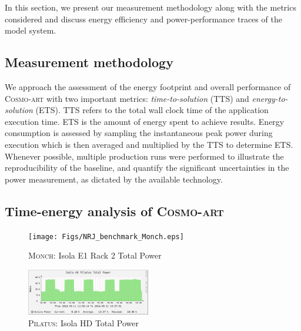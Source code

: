 In this section, we present our measurement methodology along with the
metrics considered and discuss energy efficiency and power-performance
traces of the model system.

\subsection{Measurement methodology}
\label{subsec:4.1}

We  approach  the  assessment  of  the energy  footprint  and  overall
performance   of  \textsc{Cosmo-art}   with  two   important  metrics:
\textit{time-to-solution} (TTS) and \textit{energy-to-solution} (ETS).
TTS refers to  the total wall clock time  of the application execution
time. ETS  is the amount of  energy spent to  achieve results.  Energy
consumption  is  assessed by  sampling  the  instantaneous peak  power
during execution which  is then averaged and multiplied  by the TTS to
determine  ETS.   Whenever  possible,  multiple production  runs  were
performed  to  illustrate the  reproducibility  of  the baseline,  and
quantify the  significant uncertainties  in the power  measurement, as
dictated by the available technology.

\subsection{Time-energy analysis of \textsc{Cosmo-art}}
\label{subsec:4.2}

\begin{figure}[htbf]
  \begin{center}
    \texttt{[image: Figs/NRJ\_benchmark\_Monch.eps]}
    \caption{\textsc{Monch}: Isola E1 Rack 2 Total Power}
    \label{fig:1}
  \end{center}
\end{figure}

\begin{figure}[htbf]
  \begin{center}
    \includegraphics[width=0.48\textwidth]{Figs/NRJ_benchmark_Pilatus.eps}
    \caption{\textsc{Pilatus}: Isola HD Total Power}
    \label{fig:2}
  \end{center}
\end{figure}

